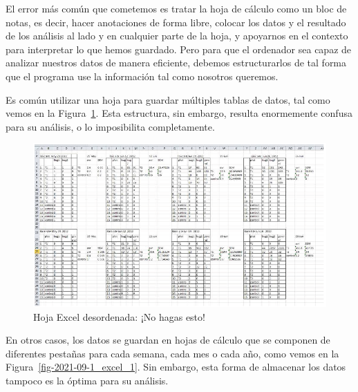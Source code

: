 \documentclass[
  letterpaper,
  DIV=11,
  numbers=noendperiod,
  oneside]{scrreprt}
\begin{document}
El error más común que cometemos es tratar la hoja de cálculo como un
bloc de notas, es decir, hacer anotaciones de forma libre, colocar los
datos y el resultado de los análisis al lado y en cualquier parte de la
hoja, y apoyarnos en el contexto para interpretar lo que hemos guardado.
Pero para que el ordenador sea capaz de analizar nuestros datos de
manera eficiente, debemos estructurarlos de tal forma que el programa
use la información tal como nosotros queremos.

Es común utilizar una hoja para guardar múltiples tablas de datos, tal
como vemos en la Figura~\ref{fig-excel_mess}. Esta estructura, sin
embargo, resulta enormemente confusa para su análisis, o lo imposibilita
completamente.

\begin{figure}

{\centering \includegraphics{01-imagenes/excel_mess.png}

}

\caption{\label{fig-excel_mess}Hoja Excel desordenada: ¡No hagas esto!}

\end{figure}

En otros casos, los datos se guardan en hojas de cálculo que se componen
de diferentes pestañas para cada semana, cada mes o cada año, como vemos
en la Figura~\ref{fig-2021-09-1_excel_1}. Sin embargo, esta forma de
almacenar los datos tampoco es la óptima para su análisis.
\end{document}
